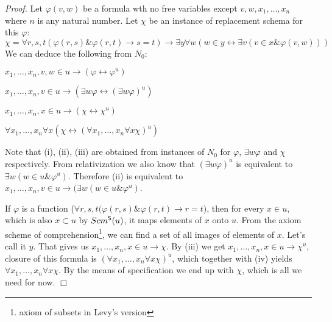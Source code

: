 \documentclass[12pt,a4paper]{article}
\newenvironment{proof}
{\noindent \textit{Proof.}}
{\hspace*{\fill} $\Box$}
\renewcommand{\iff}{\leftrightarrow}
\newcommand{\then}{\rightarrow}
\newcommand{\bce}{\begin{compactenum}}
\newcommand{\ece}{\end{compactenum}}
\begin{document}
\begin{proof}
Let $\varphi(v, w)$ be a formula wth no free variables except $v, w, x_1, \ldots, x_n$ where $n$ is any natural number.
Let $\chi$ be an instance of replacement schema for this $\varphi$:
\begin{equation}
\chi = \forall r, s, t(\varphi(r, s) \& \varphi(r, t) \then s = t) \then \exists y \forall w (w \in y \iff \exists v (v \in x \& \varphi(v, w)))
\end{equation}
\medskip
We can deduce the following from $N_0$: 
\bce[(i)]
\item $x_1, \ldots, x_n, v, w \in u \then (\varphi \iff \varphi^{u}) $
\item $x_1, \ldots, x_n, v \in u \then (\exists w \varphi \iff (\exists w \varphi)^{u})$
\item $x_1, \ldots, x_n, x \in u \then (\chi \iff \chi^{u})$
\item $\forall x_1, \ldots, x_n \forall x (\chi \iff (\forall x_1, \ldots, x_n \forall x \chi)^{u})$
\ece

Note that (i), (ii), (iii) are obtained from instances of $N_0$ for $\varphi$, $\exists w \varphi$ and $\chi$ respectively.  %
From relativization we also know that $(\exists w \varphi)^{u}$ is equivalent to $\exists w (w \in u \& \varphi^{u})$.
Therefore (ii) is equivalent to $x_1, \ldots, x_n, v \in u \then (\exists w (w \in u \& \varphi^{u})$. 

If $\varphi$ is a function ($ \forall r, s, t(\varphi(r, s) \& \varphi(r, t) \then r=t $), then for every $x \in u$, which is also $x \subset u$ by $Scm^{\sf{S}}(u)$,
it maps elements of $x$ onto $u$. From the axiom scheme of comprehension\footnote{axiom of subsets in Levy's version}, we can find a set of all images of elements of $x$. Let's call it $y$.
That gives us $x_1, \ldots, x_n, x \in u \then \chi$. By (iii) we get $x_1, \ldots, x_n, x \in u \then \chi^{u}$, closure of this formula is $(\forall x_1, \ldots, x_n \forall x \chi)^{u}$, 
which together with (iv) yields $\forall x_1, \ldots, x_n \forall x \chi$. By the means of specification we end up with $\chi$, which is all we need for now. 
\end{proof}


\end{document}
